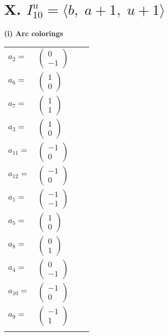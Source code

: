 \documentclass[1p]{elsarticle_modified}
\theoremstyle{definition}
\begin{document}
\centering \section*{X. $I^u_{10}= \langle b,\;a+1,\;u+1 \rangle$}
\flushleft \textbf{(i) Arc colorings}\\
\begin{tabular}{m{7pt} m{180pt} m{7pt} m{180pt} }
\flushright $a_{2}=$&$\begin{pmatrix}0\\-1\end{pmatrix}$ \\
\flushright $a_{6}=$&$\begin{pmatrix}1\\0\end{pmatrix}$ \\
\flushright $a_{7}=$&$\begin{pmatrix}1\\1\end{pmatrix}$ \\
\flushright $a_{3}=$&$\begin{pmatrix}1\\0\end{pmatrix}$ \\
\flushright $a_{11}=$&$\begin{pmatrix}-1\\0\end{pmatrix}$ \\
\flushright $a_{12}=$&$\begin{pmatrix}-1\\0\end{pmatrix}$ \\
\flushright $a_{1}=$&$\begin{pmatrix}-1\\-1\end{pmatrix}$ \\
\flushright $a_{5}=$&$\begin{pmatrix}1\\0\end{pmatrix}$ \\
\flushright $a_{8}=$&$\begin{pmatrix}0\\1\end{pmatrix}$ \\
\flushright $a_{4}=$&$\begin{pmatrix}0\\-1\end{pmatrix}$ \\
\flushright $a_{10}=$&$\begin{pmatrix}-1\\0\end{pmatrix}$ \\
\flushright $a_{9}=$&$\begin{pmatrix}-1\\1\end{pmatrix}$\\&\end{tabular}
\end{document}
